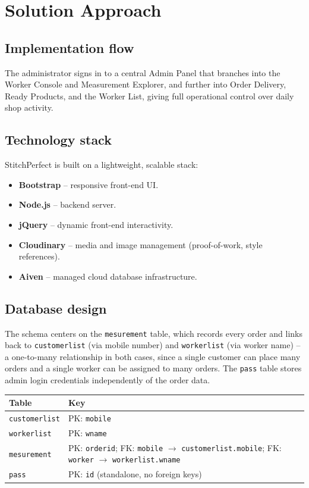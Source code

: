 \documentclass[11pt]{article}
\begin{document}
\section{Solution Approach}

\subsection{Implementation flow}
The administrator signs in to a central Admin Panel that branches into the Worker Console and
Measurement Explorer, and further into Order Delivery, Ready Products, and the Worker List,
giving full operational control over daily shop activity.

\subsection{Technology stack}
StitchPerfect is built on a lightweight, scalable stack:
\begin{itemize}[leftmargin=1.5em]
  \item \textbf{Bootstrap} -- responsive front-end UI.
  \item \textbf{Node.js} -- backend server.
  \item \textbf{jQuery} -- dynamic front-end interactivity.
  \item \textbf{Cloudinary} -- media and image management (proof-of-work, style references).
  \item \textbf{Aiven} -- managed cloud database infrastructure.
\end{itemize}

\subsection{Database design}
The schema centers on the \texttt{mesurement} table, which records every order and links back to
\texttt{customerlist} (via mobile number) and \texttt{workerlist} (via worker name) -- a
one-to-many relationship in both cases, since a single customer can place many orders and a
single worker can be assigned to many orders. The \texttt{pass} table stores admin login
credentials independently of the order data.

\begin{center}
\begin{tabular}{@{}ll@{}}
\toprule
\textbf{Table} & \textbf{Key} \\
\midrule
\texttt{customerlist} & PK: \texttt{mobile} \\
\texttt{workerlist} & PK: \texttt{wname} \\
\texttt{mesurement} & PK: \texttt{orderid}; FK: \texttt{mobile} $\to$ \texttt{customerlist.mobile}; FK: \texttt{worker} $\to$ \texttt{workerlist.wname} \\
\texttt{pass} & PK: \texttt{id} (standalone, no foreign keys) \\
\bottomrule
\end{tabular}
\end{center}
\end{document}
